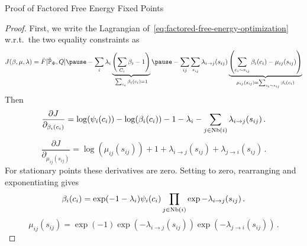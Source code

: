 \begin{frame}{Proof of Factored Free Energy Fixed Points}
    \begin{proof}
       First, we write the Lagrangian of~\eqref{eq:factored-free-energy-optimization} w.r.t.\ the two equality constraints as 
       \begin{equation}
        J(\beta,\mu,\lambda) = \tilde{F}[\tilde{\Pb}_{\Phi},Q]
        \pause
        - \sum_i \lambda_i \underbrace{\left( \sum_{C_i} \beta_i - 1 \right)}_{\sum_{c_i} \beta_i(c_i) = 1}
        \pause
        - \sum_{ij} \sum_{s_{ij}}\lambda_{i \rightarrow j}(s_{ij}) \underbrace{\left( \sum_{c_i \sim s_{ij}} \beta_i(c_i) - \mu_{ij}(s_{ij}) \right)}_{\mu_{ij}(s_{ij}) = \sum_{c_i \sim s_{ij}} \beta_i(c_i)}
       \end{equation}
       \pause
    Then
    \begin{equation}
        \frac{\partial J}{\partial_{\beta_i(c_i)}} = \log(\psi_i(c_i)) - \log(\beta_i(c_i)) - 1 - \lambda_i - \sum_{j \in \text{Nb}(i)} \lambda_{i \rightarrow j}(s_{ij}) \,.
    \end{equation}
    \pause
    \begin{equation}
        \frac{\partial J}{\partial_{\mu_{ij}(s_{ij})}} = \log(\mu_{ij}(s_{ij})) + 1 + \lambda_{i \rightarrow j}(s_{ij}) + \lambda_{j \rightarrow i}(s_{ij}) \,.
    \end{equation}
    \pause
    For stationary points these derivatives are zero. Setting to zero, rearranging and exponentiating gives
    \pause
    \begin{equation}
        \beta_i(c_i) = \exp(-1-\lambda_i) \psi_i(c_i) \prod_{j \in \text{Nb}(i)} \exp{-\lambda_{i \rightarrow j}(s_{ij})} \,.
    \end{equation}
    \pause
    \begin{equation}
        \label{eq:mu-exp-lambda}
        \mu_{ij}(s_{ij}) = \exp(-1) \exp(-\lambda_{i \rightarrow j}(s_{ij})) \exp(-\lambda_{j \rightarrow i}(s_{ij})) \,.
    \end{equation}
\end{proof}
\end{frame}

